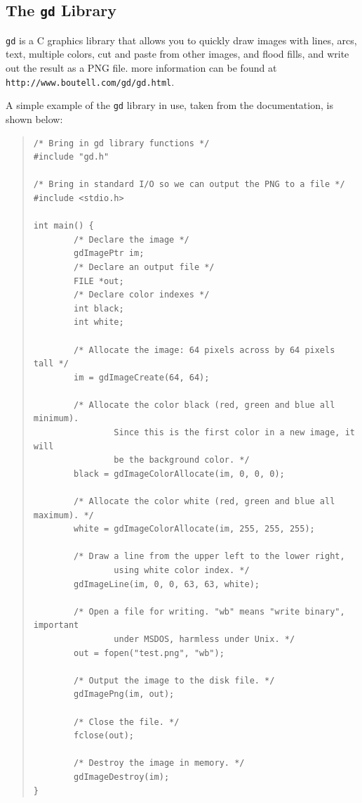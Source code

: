\documentclass[twoside,11pt]{article}
\newcommand{\htmladdnormallink}[2]{#1}
\newcommand{\htmlref}[2]{#1}
\newcommand{\latex}[1]{#1}
\newcommand{\xlabel}[1]{}
\begin{document}
\subsection{\xlabel{sc15_gd}The {\tt gd} Library\label{sc15_gd}}

\htmladdnormallink{{\tt gd}}{http://www.boutell.com/gd/gd.html} is a C
graphics library that allows you to quickly draw images with lines,
arcs, text, multiple colors, cut and paste from other images, and
flood fills, and write out the result as a \htmlref{PNG}{sc15_libpng}
file.\latex{ more information can be found at {\tt
http://www.boutell.com/gd/gd.html}.}

A simple example of the {\tt gd} library in use, taken from the
documentation, is shown below:

\small
\begin{quote}
\begin{verbatim}
/* Bring in gd library functions */
#include "gd.h"

/* Bring in standard I/O so we can output the PNG to a file */
#include <stdio.h>

int main() {
        /* Declare the image */
        gdImagePtr im;
        /* Declare an output file */
        FILE *out;
        /* Declare color indexes */
        int black;
        int white;

        /* Allocate the image: 64 pixels across by 64 pixels tall */
        im = gdImageCreate(64, 64);

        /* Allocate the color black (red, green and blue all minimum).
                Since this is the first color in a new image, it will
                be the background color. */
        black = gdImageColorAllocate(im, 0, 0, 0);      

        /* Allocate the color white (red, green and blue all maximum). */
        white = gdImageColorAllocate(im, 255, 255, 255);        
        
        /* Draw a line from the upper left to the lower right,
                using white color index. */
        gdImageLine(im, 0, 0, 63, 63, white);   

        /* Open a file for writing. "wb" means "write binary", important
                under MSDOS, harmless under Unix. */
        out = fopen("test.png", "wb");

        /* Output the image to the disk file. */
        gdImagePng(im, out);    

        /* Close the file. */
        fclose(out);

        /* Destroy the image in memory. */
        gdImageDestroy(im);
}
\end{verbatim}
\end{quote}
\normalsize
\end{document}
